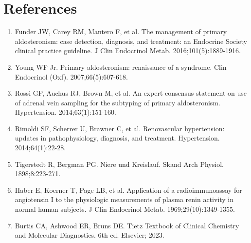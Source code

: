 \section*{References}
\begin{enumerate}
  \item Funder JW, Carey RM, Mantero F, et al. The management of primary aldosteronism: case detection, diagnosis, and treatment: an Endocrine Society clinical practice guideline. J Clin Endocrinol Metab. 2016;101(5):1889-1916.
  \item Young WF Jr. Primary aldosteronism: renaissance of a syndrome. Clin Endocrinol (Oxf). 2007;66(5):607-618.
  \item Rossi GP, Auchus RJ, Brown M, et al. An expert consensus statement on use of adrenal vein sampling for the subtyping of primary aldosteronism. Hypertension. 2014;63(1):151-160.
  \item Rimoldi SF, Scherrer U, Brawner C, et al. Renovascular hypertension: updates in pathophysiology, diagnosis, and treatment. Hypertension. 2014;64(1):22-28.
  \item Tigerstedt R, Bergman PG. Niere und Kreislauf. Skand Arch Physiol. 1898;8:223-271.
  \item Haber E, Koerner T, Page LB, et al. Application of a radioimmunoassay for angiotensin I to the physiologic measurements of plasma renin activity in normal human subjects. J Clin Endocrinol Metab. 1969;29(10):1349-1355.
  \item Burtis CA, Ashwood ER, Bruns DE. Tietz Textbook of Clinical Chemistry and Molecular Diagnostics. 6th ed. Elsevier; 2023.
\end{enumerate}

\clearpage
